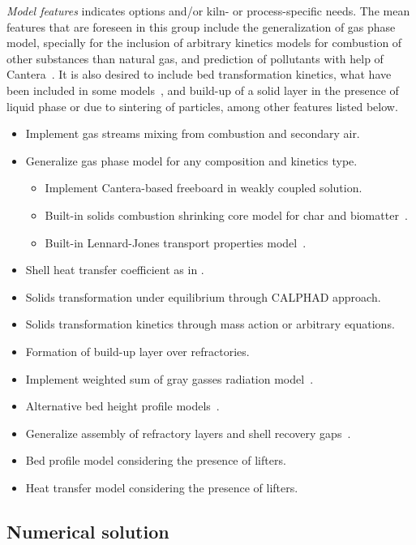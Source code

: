 \documentclass[11pt]{paper}
\newcommand{\openitem}{\item[$\square$]}
\begin{document}
\emph{Model features} indicates options and/or kiln- or process-specific needs. The mean features that are foreseen in this group include the generalization of gas phase model, specially for the inclusion of arbitrary kinetics models for combustion of other substances than natural gas, and prediction of pollutants with help of Cantera~\cite{Goodwin2014}. It is also desired to include bed transformation kinetics, what have been included in some models~\cite{Manitius1974,Mujumdar2006i,Mujumdar2006ii,Aldina2019}, and build-up of a solid layer in the presence of liquid phase or due to sintering of particles, among other features listed below.

\begin{itemize}
\openitem Implement gas streams mixing from combustion and secondary air.
\openitem Generalize gas phase model for any composition and kinetics type.
\begin{itemize}
    \openitem Implement Cantera-based freeboard in weakly coupled solution.
    \openitem Built-in solids combustion shrinking core model for char and biomatter~\cite{Patisson2000a,Patisson2000b,Mujumdar2006i,Bhuiyan2015,Mikulcic2015}.
    \openitem Built-in Lennard-Jones transport properties model~\cite{Bird2001}.
\end{itemize}
\openitem Shell heat transfer coefficient as in \textcite{Barr1989ii}.
\openitem Solids transformation under equilibrium through {CALPHAD} approach.
\openitem Solids transformation kinetics through mass action or arbitrary equations.
\openitem Formation of build-up layer over refractories.
\openitem Implement weighted sum of gray gasses radiation model~\cite{Khare2017}.
\openitem Alternative bed height profile models~\cite{DasGupta1991,Ngako2015}.
\openitem Generalize assembly of refractory layers and shell recovery gaps~\cite{Mujumdar2006i}.
\openitem Bed profile model considering the presence of lifters.
\openitem Heat transfer model considering the presence of lifters.
\end{itemize}

\subsection*{Numerical solution}
\end{document}
